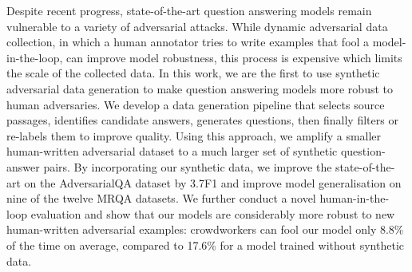 Despite recent progress, state-of-the-art question answering models remain vulnerable to a variety of adversarial attacks. While dynamic adversarial data collection, in which a human annotator tries to write examples that fool a model-in-the-loop, can improve model robustness, this process is expensive which limits the scale of the collected data. In this work, we are the first to use synthetic adversarial data generation to make question answering models more robust to human adversaries. We develop a data generation pipeline that selects source passages, identifies candidate answers, generates questions, then finally filters or re-labels them to improve quality. Using this approach, we amplify a smaller human-written adversarial dataset to a much larger set of synthetic question-answer pairs. By incorporating our synthetic data, we improve the state-of-the-art on the AdversarialQA dataset by 3.7F1 and improve model generalisation on nine of the twelve MRQA datasets. We further conduct a novel human-in-the-loop evaluation and show that our models are considerably more robust to new human-written adversarial examples: crowdworkers can fool our model only 8.8\% of the time on average, compared to 17.6\% for a model trained without synthetic data.
